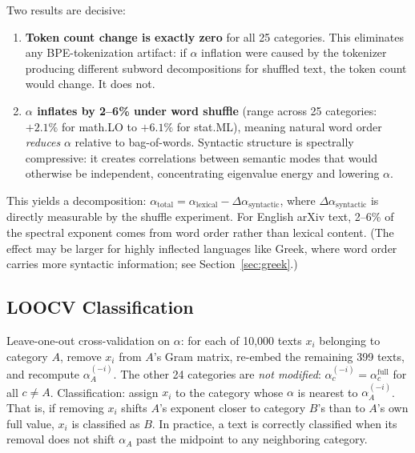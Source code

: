\documentclass[12pt,letterpaper]{article}
\newcommand{\al}{\alpha}
\newcommand{\dalpha}{\Delta\alpha}
\begin{document}
Two results are decisive:

\begin{enumerate}
\item \textbf{Token count change is exactly zero} for all 25
categories.  This eliminates any BPE-tokenization artifact: if
$\al$ inflation were caused by the tokenizer producing different
subword decompositions for shuffled text, the token count would
change.  It does not.

\item \textbf{$\al$ inflates by 2--6\% under word shuffle} (range
across 25 categories: $+2.1\%$ for math.LO to $+6.1\%$ for
stat.ML), meaning natural word order \emph{reduces} $\al$ relative
to bag-of-words.  Syntactic structure is spectrally compressive: it
creates correlations between semantic modes that would otherwise be
independent, concentrating eigenvalue energy and lowering $\al$.
\end{enumerate}

This yields a decomposition: $\al_{\text{total}} =
\al_{\text{lexical}} - \dalpha_{\text{syntactic}}$, where
$\dalpha_{\text{syntactic}}$ is directly measurable by the shuffle
experiment.  For English arXiv text, 2--6\% of the spectral
exponent comes from word order rather than lexical content.  (The
effect may be larger for highly inflected languages like Greek,
where word order carries more syntactic information; see
Section~\ref{sec:greek}.)

\subsection{LOOCV Classification}
\label{sec:loocv}

Leave-one-out cross-validation on $\al$: for each of 10{,}000
texts $x_i$ belonging to category $A$, remove $x_i$ from $A$'s
Gram matrix, re-embed the remaining 399 texts, and recompute
$\al_A^{(-i)}$.  The other 24 categories are \emph{not modified}:
$\al_c^{(-i)} = \al_c^{\text{full}}$ for all $c \neq A$.
Classification: assign $x_i$ to the category whose $\al$ is
nearest to $\al_A^{(-i)}$.  That is, if removing $x_i$ shifts
$A$'s exponent closer to category $B$'s than to $A$'s own full
value, $x_i$ is classified as $B$.  In practice, a text is
correctly classified when its removal does not shift $\al_A$
past the midpoint to any neighboring category.
\end{document}
